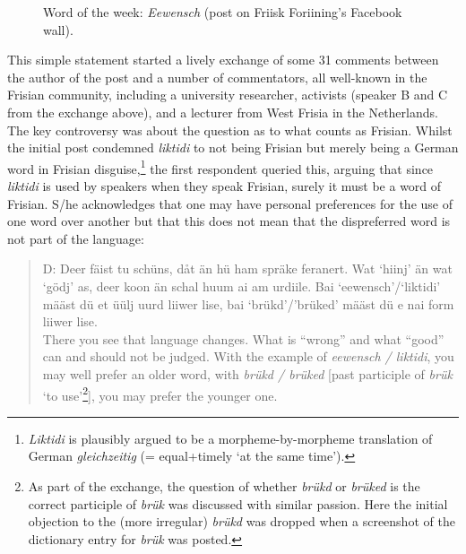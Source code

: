 \documentclass[output=paper]{langsci/langscibook}
\begin{document}
 \begin{figure}
 \caption{Word of the week: \textit{Eewensch} (post on Friisk Foriining’s Facebook wall).}\label{fig:gregersen:3}
 \end{figure}

This simple statement started a lively exchange of some 31 comments between the author of the post and a number of commentators, all well-known in the Frisian community, including a university researcher, activists (speaker B and C from the exchange above), and a lecturer from West Frisia in the Netherlands. The key controversy was about the question as to what counts as Frisian. Whilst the initial post condemned \textit{liktidi} to not being Frisian but merely being a German word in Frisian disguise,\footnote{\textit{Liktidi} is plausibly argued to be a morpheme-by-morpheme translation of German \textit{gleichzeitig} (= equal+timely ‘at the same time’).} the first respondent queried this, arguing that since \textit{liktidi} is used by speakers when they speak Frisian, surely it must be a word of Frisian. S/he acknowledges that one may have personal preferences for the use of one word over another but that this does not mean that the dispreferred word is not part of the language:

\begin{quote}
D: Deer fäist tu schüns, dåt än hü ham spräke feranert. Wat ‘hiinj’ än wat ‘gödj’ as, deer koon än schal huum ai am urdiile. Bai ‘eewensch’/‘liktidi’ määst dü et üülj uurd liiwer lise, bai ‘brükd’/’brüked’ määst dü e nai form liiwer lise. \bigskip\\\relax
There you see that language changes. What is “wrong” and what “good” can and should not be judged. With the example of \textit{eewensch / liktidi}, you may well prefer an older word, with \textit{brükd / brüked} [past participle of \textit{brük} ‘to use’\footnote{As part of the exchange, the question of whether \textit{brükd} or \textit{brüked} is the correct participle of \textit{brük} was discussed with similar passion. Here the initial objection to the (more irregular) \textit{brükd} was dropped when a screenshot of the dictionary entry for \textit{brük} was posted.}], you may prefer the younger one. 
\end{quote}
\end{document}
